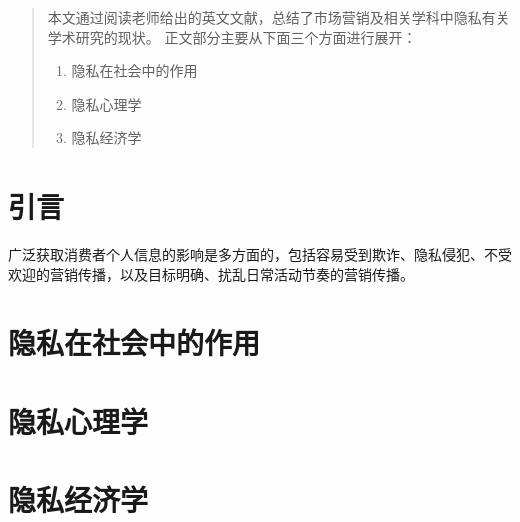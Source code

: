 \documentclass[degree=project,degree-type=project,cjk-font=noto]{thuthesis}
\begin{document}
\maketitle

\frontmatter
\begin{abstract}
  本文通过阅读老师给出的英文文献，总结了市场营销及相关学科中隐私有关学术研究的现状。
  正文部分主要从下面三个方面进行展开：

  \begin{enumerate}
    \item 隐私在社会中的作用
    \item 隐私心理学
    \item 隐私经济学
  \end{enumerate}



\end{abstract}

\tableofcontents


\mainmatter

\chapter{引言}

广泛获取消费者个人信息的影响是多方面的，包括容易受到欺诈、隐私侵犯、不受欢迎的营销传播，以及目标明确、扰乱日常活动节奏的营销传播。


\chapter{隐私在社会中的作用}

\chapter{隐私心理学}

\chapter{隐私经济学}

\backmatter


\appendix
\end{document}
